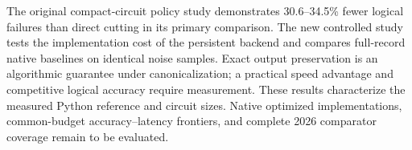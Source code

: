 The original compact-circuit policy study demonstrates 30.6--34.5\% fewer logical failures than direct cutting in its primary comparison. The new controlled study tests the implementation cost of the persistent backend and compares full-record native baselines on identical noise samples. Exact output preservation is an algorithmic guarantee under canonicalization; a practical speed advantage and competitive logical accuracy require measurement. These results characterize the measured Python reference and circuit sizes. Native optimized implementations, common-budget accuracy--latency frontiers, and complete 2026 comparator coverage remain to be evaluated.
